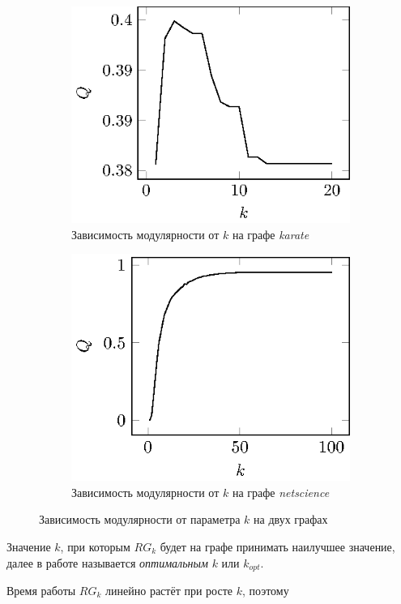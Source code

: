 \begin{figure}[h!]
	\centering
	\begin{subfigure}{.45\textwidth}
		\centering
		\includegraphics[width=\linewidth]{prodanov/prodanov_validity_karate.eps}
		\caption{Зависимость модулярности от $k$ на графе \emph{karate}}
		\label{fig:spsa_validity_karate}
	\end{subfigure}
	\begin{subfigure}{.1\textwidth}
	\end{subfigure}
	\begin{subfigure}{.45\textwidth}
		\centering
		\includegraphics[width=\linewidth]{prodanov/prodanov_validity_netscience.eps}
		\caption{Зависимость модулярности от $k$ на графе \emph{netscience}}
		\label{fig:spsa_validity_netscience}
	\end{subfigure}
\caption{Зависимость модулярности от параметра $k$ на двух графах}
\label{fig:spsa_validity}
\end{figure}

Значение $k$, при которым $RG_k$ будет на графе принимать наилучшее значение, далее в работе называется \emph{оптимальным} $k$ или $k_{opt}$.

Время работы $RG_k$ линейно растёт при росте $k$, поэтому
